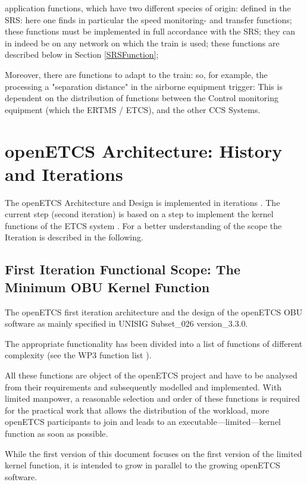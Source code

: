\documentclass{template/openetcs_report}
\begin{document}
application functions, which have two different species of origin: 
defined in the \gls{SRS}: here one finds in particular the 
speed monitoring- and transfer functions; these functions 
must be implemented in full accordance with the \gls{SRS}; they can in 
indeed be on any network on which the train is used; these functions 
are described below in Section \ref{SRSFunction}; 


Moreover, there are functions to adapt to the train: so, for example, the processing 
a "separation distance" in the airborne equipment trigger: 
This is dependent on the distribution of functions between the 
Control monitoring equipment (which the ERTMS / ETCS), and the other 
CCS Systems.

\section{openETCS Architecture: History and Iterations}

The openETCS Architecture and Design is implemented in iterations \cite{deployment}. The current step (second iteration) is based on a step to implement the kernel functions of the ETCS system \cite{firstIteration}. For a better understanding of the scope the Iteration is described in the following.

\subsection{First Iteration Functional Scope: The Minimum OBU Kernel Function}
\label{sec:FunctionalScopeTheMinimumOBUKernelFunction}

The openETCS first iteration architecture and the design of the openETCS OBU software as mainly specified in \cite{subset-026} UNISIG Subset\_026 version\_3.3.0. 

The appropriate functionality has been divided into a list of functions of different complexity (see the WP3 function list \cite{functions}).

All these functions are object of the openETCS project and have to be analysed from their requirements and subsequently modelled and implemented. With limited manpower, a reasonable selection and order of these functions is required for the practical work that allows the distribution of the workload, more openETCS participants to join and leads to an executable---limited---kernel function as soon as possible. 

While the first version of this document focuses on the first version of the limited kernel function, it is intended to grow in parallel to the growing openETCS software.
\end{document}
